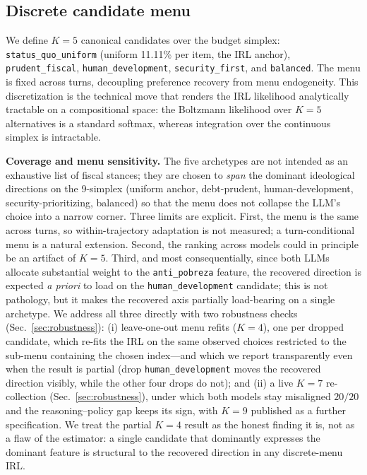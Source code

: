 \documentclass[conference]{IEEEtran}
\begin{document}
\subsection{Discrete candidate menu}

We define $K=5$ canonical candidates over the budget simplex:
\texttt{status\_quo\_uniform} (uniform 11.11\% per item, the IRL
anchor), \texttt{prudent\_fiscal}, \texttt{human\_development},
\texttt{security\_first}, and \texttt{balanced}. The menu is
fixed across turns, decoupling preference recovery from menu
endogeneity. This discretization is the technical move that renders
the IRL likelihood analytically tractable on a compositional space:
the Boltzmann likelihood over $K=5$ alternatives is a standard softmax,
whereas integration over the continuous simplex is intractable.

\textbf{Coverage and menu sensitivity.} The five archetypes are not
intended as an exhaustive list of fiscal stances; they are chosen to
\emph{span} the dominant ideological directions on the 9-simplex
(uniform anchor, debt-prudent, human-development, security-prioritizing,
balanced) so that the menu does not collapse the LLM's choice into a
narrow corner. Three limits are explicit. First, the menu is the same
across turns, so within-trajectory adaptation is not measured; a
turn-conditional menu is a natural extension. Second, the ranking
across models could in principle be an artifact of $K{=}5$. Third,
and most consequentially, since both LLMs allocate substantial weight
to the \texttt{anti\_pobreza} feature, the recovered direction is
expected \emph{a priori} to load on the \texttt{human\_development}
candidate; this is not pathology, but it makes the recovered axis
partially load-bearing on a single archetype. We address all three
directly with two robustness checks (Sec.~\ref{sec:robustness}):
(i) leave-one-out menu refits ($K{=}4$), one per dropped candidate,
which re-fits the IRL on the same observed choices restricted to the
sub-menu containing the chosen index---and which we report transparently
even when the result is partial (drop \texttt{human\_development}
moves the recovered direction visibly, while the other four drops do
not); and (ii) a live $K{=}7$ re-collection (Sec.~\ref{sec:robustness}),
under which both models stay misaligned $20/20$ and the
reasoning--policy gap keeps its sign, with $K{=}9$ published as a
further specification. We treat
the partial $K{=}4$ result as the honest finding it is, not as a flaw
of the estimator: a single candidate that dominantly expresses the
dominant feature is structural to the recovered direction in any
discrete-menu IRL.
\end{document}
